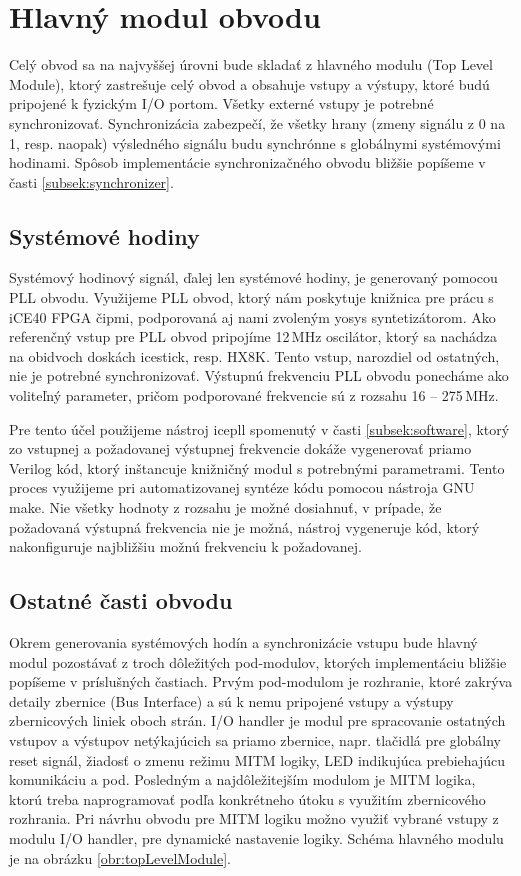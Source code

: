 \section{Hlavný modul obvodu}\label{sek:topLevelModule}
Celý obvod sa na najvyššej úrovni bude skladať z hlavného modulu (Top Level Module), ktorý zastrešuje celý obvod a obsahuje vstupy a výstupy, ktoré budú pripojené k fyzickým I/O portom. Všetky externé vstupy je potrebné synchronizovať. Synchronizácia zabezpečí, že všetky hrany (zmeny signálu z 0 na 1, resp. naopak) výsledného signálu budu synchrónne s globálnymi systémovými hodinami. Spôsob implementácie synchronizačného obvodu bližšie popíšeme v časti \ref{subsek:synchronizer}.

\subsection{Systémové hodiny}
Systémový hodinový signál, ďalej len systémové hodiny, je generovaný pomocou PLL obvodu. Využijeme PLL obvod, ktorý nám poskytuje knižnica pre prácu s iCE40 FPGA čipmi, podporovaná aj nami zvoleným yosys syntetizátorom. Ako referenčný vstup pre PLL obvod pripojíme 12\,MHz oscilátor, ktorý sa nachádza na obidvoch doskách icestick, resp. HX8K. Tento vstup, narozdiel od ostatných, nie je potrebné synchronizovať. Výstupnú frekvenciu PLL obvodu ponecháme ako voliteľný parameter, pričom podporované frekvencie sú z rozsahu 16 -- 275\,MHz.

Pre tento účel použijeme nástroj icepll spomenutý v časti \ref{subsek:software}, ktorý zo vstupnej a požadovanej výstupnej frekvencie dokáže vygenerovať priamo Verilog kód, ktorý inštancuje knižničný modul s potrebnými parametrami.
Tento proces využijeme pri automatizovanej syntéze kódu pomocou nástroja GNU make. Nie všetky hodnoty z rozsahu je možné dosiahnuť, v prípade, že požadovaná výstupná frekvencia nie je možná, nástroj vygeneruje kód, ktorý nakonfiguruje najbližšiu možnú frekvenciu k požadovanej.

\subsection{Ostatné časti obvodu}
Okrem generovania systémových hodín a synchronizácie vstupu bude hlavný modul pozostávať z troch dôležitých pod-modulov, ktorých implementáciu bližšie popíšeme v príslušných častiach. Prvým pod-modulom je rozhranie, ktoré zakrýva detaily zbernice (Bus Interface) a sú k nemu pripojené vstupy a výstupy zbernicových liniek oboch strán. I/O handler je modul pre spracovanie ostatných vstupov a výstupov netýkajúcich sa priamo zbernice, napr. tlačidlá pre globálny reset signál, žiadosť o zmenu režimu MITM logiky, LED indikujúca prebiehajúcu komunikáciu a pod. Posledným a najdôležitejším modulom je MITM logika, ktorú treba naprogramovať podľa konkrétneho útoku s využitím zbernicového rozhrania. Pri návrhu obvodu pre MITM logiku možno využiť vybrané vstupy z modulu I/O handler, pre dynamické nastavenie logiky. Schéma hlavného modulu je na obrázku \ref{obr:topLevelModule}.

